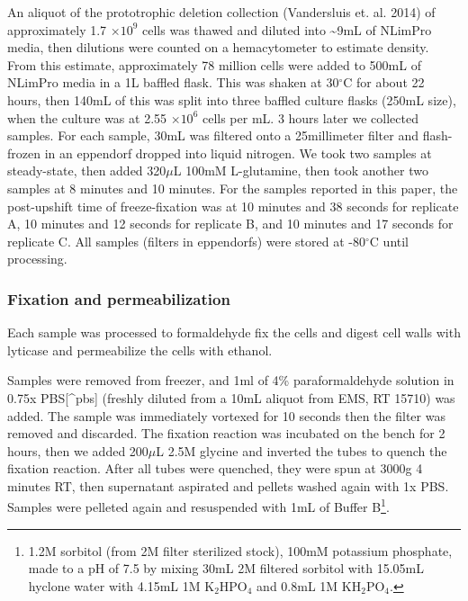 {An aliquot of the prototrophic deletion collection (Vandersluis et. al.
2014) of approximately 1.7 \(\times 10^9\) cells was thawed and diluted
into \textasciitilde{}9mL of NLimPro media, then dilutions were counted
on a hemacytometer to estimate density. From this estimate,
approximately 78 million cells were added to 500mL of NLimPro media in a
1L baffled flask. This was shaken at 30\(^{\circ}\)C for about 22 hours,
then 140mL of this was split into three baffled culture flasks (250mL
size), when the culture was at 2.55 \(\times 10^6\) cells per mL. 3
hours later we collected samples. For each sample, 30mL was filtered
onto a 25millimeter filter and flash-frozen in an eppendorf dropped into
liquid nitrogen. We took two samples at steady-state, then added
320\(\mu\)L 100mM L-glutamine, then took another two samples at 8
minutes and 10 minutes. For the samples reported in this paper, the
post-upshift time of freeze-fixation was at 10 minutes and 38 seconds
for replicate A, 10 minutes and 12 seconds for replicate B, and 10
minutes and 17 seconds for replicate C. All samples (filters in
eppendorfs) were stored at -80\(^{\circ}\)C until processing.

\subsubsection{Fixation and
permeabilization}\label{fixation-and-permeabilization}

Each sample was processed to formaldehyde fix the cells and digest cell
walls with lyticase and permeabilize the cells with ethanol.

Samples were removed from freezer, and 1ml of 4\% paraformaldehyde
solution in 0.75x PBS{[}\^{}pbs{]} (freshly diluted from a 10mL aliquot
from EMS, RT 15710) was added. The sample was immediately vortexed for
10 seconds then the filter was removed and discarded. The fixation
reaction was incubated on the bench for 2 hours, then we added
200\(\mu\)L 2.5M glycine and inverted the tubes to quench the fixation
reaction. After all tubes were quenched, they were spun at 3000g 4
minutes RT, then supernatant aspirated and pellets washed again with 1x
PBS. Samples were pelleted again and resuspended with 1mL of Buffer
B\footnote{1.2M sorbitol (from 2M filter sterilized stock), 100mM
  potassium phosphate, made to a pH of 7.5 by mixing 30mL 2M filtered
  sorbitol with 15.05mL hyclone water with 4.15mL 1M K\(_2\)HPO\(_4\)
  and 0.8mL 1M KH\(_2\)PO\(_4\).}.

}
